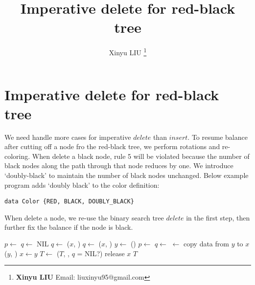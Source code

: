 \documentclass[b5paper]{article}
\begin{document}
\title{Imperative delete for red-black tree}

\author{Xinyu LIU
\thanks{{\bfseries Xinyu LIU} \newline
  Email: liuxinyu95@gmail.com \newline}
  }

\maketitle
\fi


\ifx\wholebook\relax
\chapter{Imperative delete for red-black tree}
\fi


We need handle more cases for imperative $delete$ than $insert$. To resume balance after cutting off a node fro the red-black tree, we perform rotations and re-coloring. When delete a black node, rule 5 will be violated because the number of black nodes along the path through that node reduces by one. We introduce `doubly-black' to maintain the number of black nodes unchanged. Below example program adds `doubly black' to the color definition:

\lstset{frame = single}
\begin{lstlisting}[language = Bourbaki]
data Color {RED, BLACK, DOUBLY_BLACK}
\end{lstlisting}

When delete a node, we re-use the binary search tree $delete$ in the first step, then further fix the balance if the node is black.

\begin{algorithmic}[1]
  \State $p \gets$ 
  \State $q \gets$ NIL
    \State $q \gets$ 
    \State {}($x$, ) 
    \State $q \gets$ 
    \State {}($x$, ) 
  \Else
    \State $y \gets$ ()
    \State $p \gets$ 
    \State $q \gets$ 
    \State {} $\gets$ 
    \State copy data from $y$ to $x$
    \State {}($y$, ) 
    \State $x \gets y$
  \EndIf
    \State $T \gets$ ($T$, , $q$ = NIL?)
  \EndIf
  \State release $x$
  \State \Return $T$
\EndFunction
\end{algorithmic}
\end{document}
